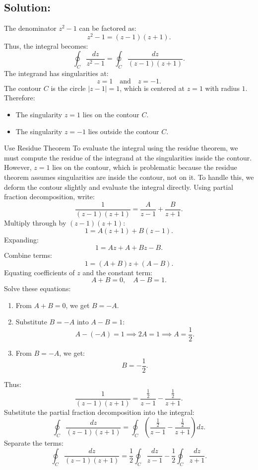 \documentclass[12pt]{article}
\begin{document}
    \subsection*{Solution:}
        The denominator \(z^2 - 1\) can be factored as:
        \[
        z^2 - 1 = (z - 1)(z + 1).
        \]
        Thus, the integral becomes:
        \[
        \oint_C \frac{dz}{z^2 - 1} = \oint_C \frac{dz}{(z - 1)(z + 1)}.
        \]
        The integrand has singularities at:
        \[
        z = 1 \quad \text{and} \quad z = -1.
        \]
        The contour \(C\) is the circle \(|z - 1| = 1\), which is centered at \(z = 1\) with radius \(1\). Therefore:
        \begin{itemize}
            \item The singularity \(z = 1\) lies on the contour \(C\).
            \item The singularity \(z = -1\) lies outside the contour \(C\).
        \end{itemize}
        Use Residue Theorem
        To evaluate the integral using the residue theorem, we must compute the residue of the integrand at the singularities inside the contour. However, \(z = 1\) lies on the contour, which is problematic because the residue theorem assumes singularities are inside the contour, not on it.
        To handle this, we deform the contour slightly and evaluate the integral directly.
        Using partial fraction decomposition, write:
        \[
        \frac{1}{(z - 1)(z + 1)} = \frac{A}{z - 1} + \frac{B}{z + 1}.
        \]
        Multiply through by \((z - 1)(z + 1)\):
        \[
        1 = A(z + 1) + B(z - 1).
        \]
        Expanding:
        \[
        1 = Az + A + Bz - B.
        \]
        Combine terms:
        \[
        1 = (A + B)z + (A - B).
        \]
        Equating coefficients of \(z\) and the constant term:
        \[
        A + B = 0, \quad A - B = 1.
        \]
        Solve these equations:
        \begin{enumerate}
            \item From \(A + B = 0\), we get \(B = -A\).
            \item Substitute \(B = -A\) into \(A - B = 1\):
            \[
            A - (-A) = 1 \implies 2A = 1 \implies A = \frac{1}{2}.
            \]
            \item From \(B = -A\), we get:
            \[
            B = -\frac{1}{2}.
            \]
        \end{enumerate}
        Thus:
        \[
        \frac{1}{(z - 1)(z + 1)} = \frac{\frac{1}{2}}{z - 1} - \frac{\frac{1}{2}}{z + 1}.
        \]
        Substitute the partial fraction decomposition into the integral:
        \[
        \oint_C \frac{dz}{(z - 1)(z + 1)} = \oint_C \left( \frac{\frac{1}{2}}{z - 1} - \frac{\frac{1}{2}}{z + 1} \right) dz.
        \]
        Separate the terms:
        \[
        \oint_C \frac{dz}{(z - 1)(z + 1)} = \frac{1}{2} \oint_C \frac{dz}{z - 1} - \frac{1}{2} \oint_C \frac{dz}{z + 1}.
        \]
\end{document}
